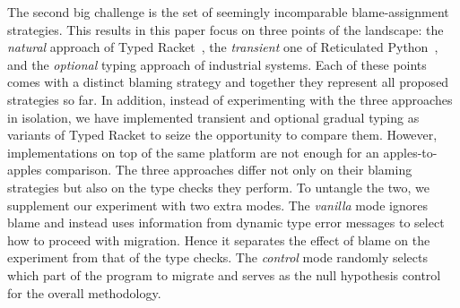 The second big challenge is the set of seemingly incomparable blame-assignment
strategies. This results in this paper focus on three points of the landscape:
the {\em natural\/} approach of Typed Racket~\cite{tf-dls-2006, tf-popl-2008,
tfffgksst-snapl-2017, tf-icfp-2010}, the {\em transient\/} one of Reticulated
Python~\cite{vsc-dls-2019,vss-popl-2017,vksb-dls-2014}, and the {\em optional\/}
typing approach of industrial systems. Each of these points comes with a
distinct blaming strategy and together they represent all proposed strategies so
far. In addition, instead of experimenting with the three approaches in
isolation, we have implemented transient and optional gradual typing as variants
of Typed Racket to seize the opportunity to compare them.  However,
implementations on top of the same platform are not enough for an
apples-to-apples comparison. The three approaches differ not only on their
blaming strategies but also on the type checks they perform. To untangle the
two, we supplement our experiment with two extra modes. The \emph{vanilla} mode
ignores blame and instead uses information from dynamic type error messages to
select how to proceed with migration. Hence it separates the effect of blame on
the experiment from that of the type checks. The \emph{control} mode randomly
selects which part of the program to migrate and serves as the null hypothesis
control for the overall methodology.

